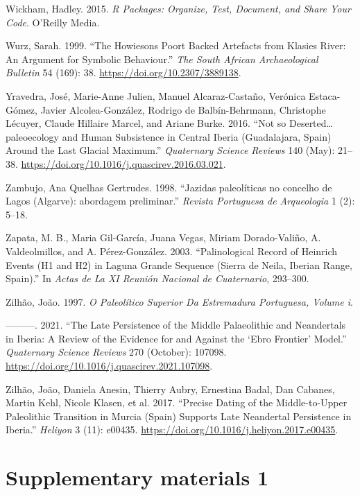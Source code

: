 \documentclass[
  a4paper,
  DIV=11,
  numbers=noendperiod]{scrreprt}
\newlength{\cslhangindent}
\newenvironment{CSLReferences}[2] %
 {\begin{list}{}{%
  \setlength{\itemindent}{0pt}
  \setlength{\leftmargin}{0pt}
  \setlength{\parsep}{0pt}
  \ifodd #1
   \setlength{\leftmargin}{\cslhangindent}
   \setlength{\itemindent}{-1\cslhangindent}
  \fi
  \setlength{\itemsep}{#2\baselineskip}}}
 {\end{list}}
\begin{document}
\begin{CSLReferences}{1}{0}
Wickham, Hadley. 2015. \emph{R {Packages}: {Organize}, {Test},
{Document}, and {Share Your Code}}. O'Reilly Media.

Wurz, Sarah. 1999. {``The Howiesons Poort Backed Artefacts from Klasies
River: An Argument for Symbolic Behaviour.''} \emph{The South African
Archaeological Bulletin} 54 (169): 38.
\url{https://doi.org/10.2307/3889138}.

Yravedra, José, Marie-Anne Julien, Manuel Alcaraz-Castaño, Verónica
Estaca-Gómez, Javier Alcolea-González, Rodrigo de Balbín-Behrmann,
Christophe Lécuyer, Claude Hillaire Marcel, and Ariane Burke. 2016.
{``Not so Deserted{\ldots{}}paleoecology and Human Subsistence in
{Central Iberia} ({Guadalajara}, {Spain}) Around the {Last Glacial
Maximum}.''} \emph{Quaternary Science Reviews} 140 (May): 21--38.
\url{https://doi.org/10.1016/j.quascirev.2016.03.021}.

Zambujo, Ana Quelhas Gertrudes. 1998. {``{Jazidas paleol{í}ticas no
concelho de Lagos (Algarve): abordagem preliminar}.''} \emph{Revista
Portuguesa de Arqueologia} 1 (2): 5--18.

Zapata, M. B., Maria Gil-García, Juana Vegas, Miriam Dorado-Valiño, A.
Valdeolmillos, and A. Pérez-González. 2003. {``Palinological Record of
Heinrich Events (H1 and H2) in Laguna Grande Sequence (Sierra de Neila,
Iberian Range, Spain).''} In \emph{Actas de La XI Reunión Nacional de
Cuaternario}, 293--300.

Zilhão, João. 1997. \emph{O Paleolítico Superior Da Estremadura
Portuguesa, Volume i}.

---------. 2021. {``The Late Persistence of the {Middle Palaeolithic}
and {Neandertals} in {Iberia}: {A} Review of the Evidence for and
Against the {`{Ebro Frontier}'} Model.''} \emph{Quaternary Science
Reviews} 270 (October): 107098.
\url{https://doi.org/10.1016/j.quascirev.2021.107098}.

Zilhão, João, Daniela Anesin, Thierry Aubry, Ernestina Badal, Dan
Cabanes, Martin Kehl, Nicole Klasen, et al. 2017. {``Precise Dating of
the {Middle-to-Upper Paleolithic} Transition in {Murcia} ({Spain})
Supports Late {Neandertal} Persistence in {Iberia}.''} \emph{Heliyon} 3
(11): e00435. \url{https://doi.org/10.1016/j.heliyon.2017.e00435}.

\end{CSLReferences}

\cleardoublepage
{}
{}
\appendix

\chapter{Supplementary materials 1}\label{supplementary-materials-1}

\section{}\label{section}
\end{document}
